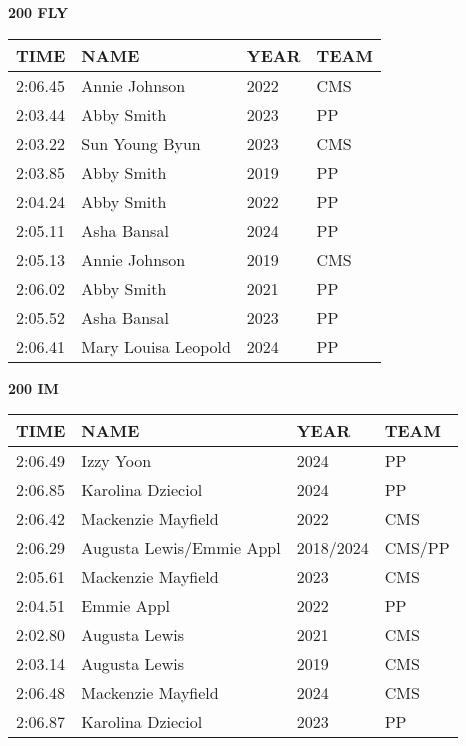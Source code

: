 \vspace{0.4cm}

\begin{minipage}[t]{0.48\textwidth}
\centering
\textbf{200 FLY}\\[0.05cm]
\begin{tabular}{@{}p{1.8cm}p{2.8cm}p{1.2cm}p{1.4cm}@{}}
\hline
\textbf{TIME} & \textbf{NAME} & \textbf{YEAR} & \textbf{TEAM} \\
\hline
2:06.45 & Annie Johnson & 2022 & CMS \\
2:03.44 & Abby Smith & 2023 & PP \\
2:03.22 & Sun Young Byun & 2023 & CMS \\
2:03.85 & Abby Smith & 2019 & PP \\
2:04.24 & Abby Smith & 2022 & PP \\
2:05.11 & Asha Bansal & 2024 & PP \\
2:05.13 & Annie Johnson & 2019 & CMS \\
2:06.02 & Abby Smith & 2021 & PP \\
2:05.52 & Asha Bansal & 2023 & PP \\
2:06.41 & Mary Louisa Leopold & 2024 & PP \\
\hline
\end{tabular}
\end{minipage}\hfill
\begin{minipage}[t]{0.48\textwidth}
\centering
\textbf{200 IM}\\[0.05cm]
\begin{tabular}{@{}p{1.8cm}p{2.8cm}p{1.2cm}p{1.4cm}@{}}
\hline
\textbf{TIME} & \textbf{NAME} & \textbf{YEAR} & \textbf{TEAM} \\
\hline
2:06.49 & Izzy Yoon & 2024 & PP \\
2:06.85 & Karolina Dzieciol & 2024 & PP \\
2:06.42 & Mackenzie Mayfield & 2022 & CMS \\
2:06.29 & Augusta Lewis/Emmie Appl & 2018/2024 & CMS/PP \\
2:05.61 & Mackenzie Mayfield & 2023 & CMS \\
2:04.51 & Emmie Appl & 2022 & PP \\
2:02.80 & Augusta Lewis & 2021 & CMS \\
2:03.14 & Augusta Lewis & 2019 & CMS \\
2:06.48 & Mackenzie Mayfield & 2024 & CMS \\
2:06.87 & Karolina Dzieciol & 2023 & PP \\
\hline
\end{tabular}
\end{minipage}

